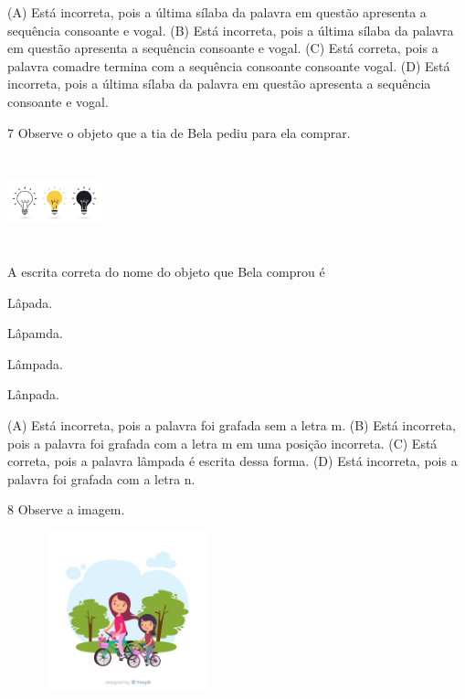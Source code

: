 (A) Está incorreta, pois a última sílaba da palavra em questão apresenta a sequência consoante e vogal.
(B) Está incorreta, pois a última sílaba da palavra em questão apresenta a sequência consoante e vogal.
(C) Está correta, pois a palavra comadre termina com a sequência consoante consoante vogal.
(D) Está incorreta, pois a última sílaba da palavra em questão apresenta a sequência consoante e vogal.

\num{7} Observe o objeto que a tia de Bela pediu para ela comprar.

\includegraphics[width=1.07025in,height=1.04487in]{media/image178.jpeg}


A escrita correta do nome do objeto que Bela comprou é

\begin{escolha}
\item Lâpada.

\item Lâpamda.

\item Lâmpada.

\item Lânpada.
\end{escolha}


(A) Está incorreta, pois a palavra foi grafada sem a letra m.
(B) Está incorreta, pois a palavra foi grafada com a letra m em uma posição incorreta.
(C) Está correta, pois a palavra lâmpada é escrita dessa forma.
(D) Está incorreta, pois a palavra foi grafada com a letra n.

\num{8} Observe a imagem.

\includegraphics[width=2.76266in,height=1.82051in]{media/image179.png}

